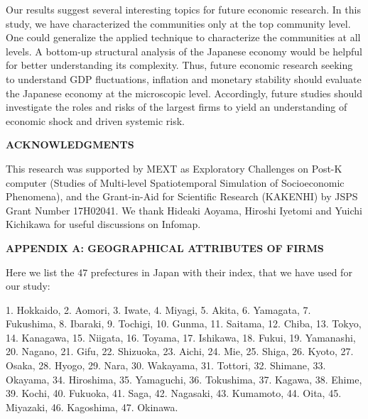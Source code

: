\documentclass[pre,floatfix,twocolumn,showpacs,a4paper,nofootinbib]{revtex4}
\begin{document}

Our results suggest several interesting topics for future economic research. 
In this study, we have characterized the communities only at the top community level.
One could generalize the applied technique to characterize the communities at all levels.
A bottom-up structural analysis of the Japanese economy would be helpful for better understanding its complexity. 
Thus, future economic research seeking to understand GDP
fluctuations, inflation and monetary stability should evaluate the Japanese economy at the microscopic
level. 
Accordingly,
future studies should investigate the roles and risks of the largest firms
to yield an understanding of economic shock and driven systemic risk.


\noindent
\begin{center}
{\bf ACKNOWLEDGMENTS}
\end{center}
This research was supported by MEXT as Exploratory Challenges on
Post-K computer (Studies of Multi-level Spatiotemporal Simulation of
Socioeconomic Phenomena), and the Grant-in-Aid for Scientific Research (KAKENHI) by JSPS Grant Number 17H02041.
We thank Hideaki Aoyama, Hiroshi Iyetomi and Yuichi Kichikawa for useful discussions on Infomap. 

\begin{center}
{\bf APPENDIX A: GEOGRAPHICAL ATTRIBUTES OF FIRMS}
\end{center}
Here we list the $47$ prefectures in Japan with their index, that we have used for our study:

1. Hokkaido, 2. Aomori, 3. Iwate, 4. Miyagi, 5. Akita, 6. Yamagata, 7. Fukushima, 8. Ibaraki, 9. Tochigi, 10. Gunma,
11. Saitama, 12. Chiba, 13. Tokyo, 14. Kanagawa, 15. Niigata, 16. Toyama, 17. Ishikawa, 18. Fukui, 19. Yamanashi, 20. Nagano,
21. Gifu, 22. Shizuoka, 23. Aichi, 24. Mie, 25. Shiga, 26. Kyoto, 27. Osaka, 28. Hyogo, 29. Nara, 30. Wakayama,
31. Tottori, 32. Shimane, 33. Okayama, 34. Hiroshima, 35. Yamaguchi, 36. Tokushima, 37. Kagawa, 38. Ehime, 39. Kochi, 40. Fukuoka,
41. Saga, 42. Nagasaki, 43. Kumamoto, 44. Oita, 45. Miyazaki, 46. Kagoshima, 47. Okinawa.
\end{document}
